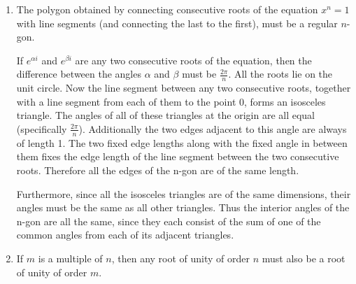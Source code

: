 \documentclass[fleqn]{article}
\newenvironment{answers}{ %
	\begin{enumerate}
		\setlength{\itemsep}{\bigskipamount}
}{\end{enumerate}}
\begin{document}
\begin{answers}
\begin{enumerate}
			\item
				For every even \(n\), there must be two real solutions to the equation \(x^n = 1\). This is because of the following which shows that both 1 and \(-1\) are real solutions the equation.
				\begin{equation*}
					\forall n \in \mathbb{N},\ (-1)^{2n} = 1^{2n} = 1
				\end{equation*}

			\item
				For every odd \(n\) there must be exactly one real solutions to the equation \(x^n = 1\). For any \(n\), \(x=1\) must be a solution, then adding \(\frac{2\pi}{n}\) radians about the unit circle gives another, and another until we arrive again at 1. Since \(n\) here is odd, \(\frac{2k\pi}{n}\) can never be equal to \(\pi\), else we would have \(n=2k\), contradicting its oddity. Thus none of the solutions are precisely \(\pi\) radians around the unit circle from 1, denying us the solution \(x=-1\) which is the only other real number on the unit circle.
		\end{enumerate}

	\item
		The polygon obtained by connecting consecutive roots of the equation \(x^n=1\) with line segments (and connecting the last to the first), must be a regular \(n\)-gon.

		If \(e^{\alpha i}\) and \(e^{\beta i}\) are any two consecutive roots of the equation, then the difference between the angles \(\alpha\) and \(\beta\) must be \(\frac{2\pi}{n}\). All the roots lie on the unit circle. Now the line segment between any two consecutive roots, together with a line segment from each of them to the point 0, forms an isosceles triangle. The angles of all of these triangles at the origin are all equal (specifically \(\frac{2\pi}{n}\)). Additionally the two edges adjacent to this angle are always of length 1. The two fixed edge lengths along with the fixed angle in between them fixes the edge length of the line segment between the two consecutive roots. Therefore all the edges of the n-gon are of the same length.

		Furthermore, since all the isosceles triangles are of the same dimensions, their angles must be the same as all other triangles. Thus the interior angles of the n-gon are all the same, since they each consist of the sum of one of the common angles from each of its adjacent triangles.

	\item
		If \(m\) is a multiple of \(n\), then any root of unity of order \(n\) must also be a root of unity of order \(m\).


\end{answers}
\end{document}
